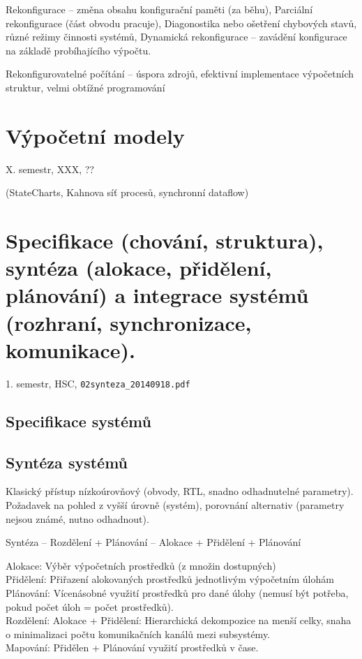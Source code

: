 \documentclass[a4paper, 11pt]{report}
\begin{document}
Rekonfigurace -- změna obsahu konfigurační paměti (za běhu), Parciální rekonfigurace (část obvodu pracuje), Diagonostika nebo ošetření chybových stavů, různé režimy činnosti systémů, Dynamická rekonfigurace -- zavádění konfigurace na základě probíhajícího výpočtu.

Rekonfigurovatelné počítání -- úspora zdrojů, efektivní implementace výpočetních struktur, velmi obtížné programování












\chapter{Výpočetní modely} \label{cha:2}
X. semestr, XXX, ??

(StateCharts, Kahnova síť procesů, synchronní dataflow)

\chapter{Specifikace (chování, struktura), syntéza (alokace, přidělení, plánování) a integrace systémů (rozhraní, synchronizace, komunikace).} \label{cha:3}
1. semestr, HSC, \texttt{02synteza\_20140918.pdf}

\section{Specifikace systémů}

\section{Syntéza systémů}
Klasický přístup nízkoúrovňový (obvody, RTL, snadno odhadnutelné parametry). Požadavek na pohled z vyšší úrovně (systém), porovnání alternativ (parametry nejsou známé, nutno odhadnout).

Syntéza -- Rozdělení + Plánování -- Alokace + Přidělení + Plánování

Alokace: Výběr výpočetních prostředků (z množin dostupných)\\
Přidělení: Přiřazení alokovaných prostředků jednotlivým výpočetním úlohám
Plánování: Vícenásobné využití prostředků pro dané úlohy (nemusí být potřeba, pokud počet úloh = počet prostředků).\\
Rozdělení: Alokace + Přidělení: Hierarchická dekompozice na menší celky, snaha o minimalizaci počtu komunikačních kanálů mezi subsystémy.\\
Mapování: Přidělen + Plánování využití prostředků v čase.
\end{document}
